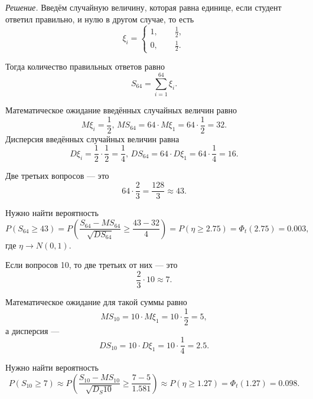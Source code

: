 \textit{Решение.}
Введём случайную величину, которая равна единице, если студент ответил правильно,
и нулю в другом случае, то есть
$$ \xi_i =
  \begin{cases}
    1, \qquad \frac{1}{2}, \\
    0, \qquad \frac{1}{2}.
  \end{cases}$$

Тогда количество правильных ответов равно
$$S_{64} =
  \sum \limits_{i = 1}^{64} \xi_i.$$

Математическое ожидание введённых случайных величин равно
$$M \xi_i = \frac{1}{2}, \,
  MS_{64} = 64 \cdot M \xi_1 = 64 \cdot \frac{1}{2} = 32.$$
Дисперсия введённых случайных величин равна
$$D \xi_i = \frac{1}{2} \cdot \frac{1}{2} = \frac{1}{4}, \,
  DS_{64} = 64 \cdot D \xi_1 = 64 \cdot \frac{1}{4} = 16.$$

Две третьих вопросов --- это
$$64 \cdot \frac{2}{3} =
  \frac{128}{3} \approx
  43.$$

Нужно найти вероятность
$$P \left( S_{64} \geq 43 \right) =
  P \left( \frac{S_{64} - MS_{64}}{ \sqrt{DS_{64}}} \geq \frac{43 - 32}{4} \right) =
  P \left( \eta \geq 2.75 \right) =
  \Phi_t \left( 2.75 \right) =
  0.003,$$
где $ \eta \to N \left( 0, 1 \right) $.

Если вопросов 10, то две третьих от них --- это
$$ \frac{2}{3} \cdot 10 \approx
  7.$$

Математическое ожидание для такой суммы равно
$$MS_{10} =
  10 \cdot M \xi_1 =
  10 \cdot \frac{1}{2} =
  5,$$
а дисперсия ---
$$DS_{10} =
  10 \cdot D \xi_1 =
  10 \cdot \frac{1}{4} =
  2.5.$$

Нужно найти вероятность
$$P \left( S_{10} \geq 7 \right) \approx
  P \left( \frac{S_{10} - MS_{10}}{ \sqrt{D_S{10}}} \geq \frac{7 - 5}{1.581} \right) \approx
  P \left( \eta \geq 1.27 \right) =
  \Phi_t \left( 1.27 \right) =
  0.098.$$
